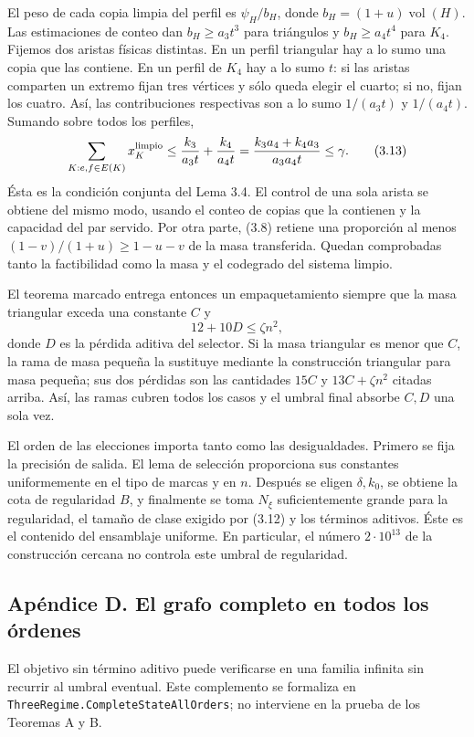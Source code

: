 \documentclass[spanish,11pt,a4paper]{article}
\begin{document}
El peso de cada copia limpia del perfil es \(\psi_H/b_H\), donde \(b_H=(1+u)\operatorname{vol}(H)\). Las estimaciones de conteo dan \(b_H\ge a_3t^3\) para triángulos y \(b_H\ge a_4t^4\) para \(K_4\). Fijemos dos aristas físicas distintas. En un perfil triangular hay a lo sumo una copia que las contiene. En un perfil de \(K_4\) hay a lo sumo \(t\): si las aristas comparten un extremo fijan tres vértices y sólo queda elegir el cuarto; si no, fijan los cuatro. Así, las contribuciones respectivas son a lo sumo \(1/(a_3t)\) y \(1/(a_4t)\). Sumando sobre todos los perfiles, \[
\sum_{K:e,f\in E(K)}x_K^{\rm limpio}
\le\frac{k_3}{a_3t}+\frac{k_4}{a_4t}
=\frac{k_3a_4+k_4a_3}{a_3a_4t}\le\gamma.
\tag{3.13}
\] Ésta es la condición conjunta del Lema 3.4. El control de una sola arista se obtiene del mismo modo, usando el conteo de copias que la contienen y la capacidad del par servido. Por otra parte, (3.8) retiene una proporción al menos \((1-v)/(1+u)\ge1-u-v\) de la masa transferida. Quedan comprobadas tanto la factibilidad como la masa y el codegrado del sistema limpio.

El teorema marcado entrega entonces un empaquetamiento siempre que la masa triangular exceda una constante \(C\) y \[
12+10D\le\zeta n^2,
\tag{3.14}
\] donde \(D\) es la pérdida aditiva del selector. Si la masa triangular es menor que \(C\), la rama de masa pequeña la sustituye mediante la construcción triangular para masa pequeña; sus dos pérdidas son las cantidades \(15C\) y \(13C+\zeta n^2\) citadas arriba. Así, las ramas cubren todos los casos y el umbral final absorbe \(C,D\) una sola vez.

El orden de las elecciones importa tanto como las desigualdades. Primero se fija la precisión de salida. El lema de selección proporciona sus constantes uniformemente en el tipo de marcas y en \(n\). Después se eligen \(\delta,k_0\), se obtiene la cota de regularidad \(B\), y finalmente se toma \(N_\xi\) suficientemente grande para la regularidad, el tamaño de clase exigido por (3.12) y los términos aditivos. Éste es el contenido del ensamblaje uniforme. En particular, el número \(2\cdot10^{13}\) de la construcción cercana no controla este umbral de regularidad.

\subsection{Apéndice D. El grafo completo en todos los órdenes}\label{apuxe9ndice-d.-el-grafo-completo-en-todos-los-uxf3rdenes}

El objetivo sin término aditivo puede verificarse en una familia infinita sin recurrir al umbral eventual. Este complemento se formaliza en \nolinkurl{ThreeRegime.CompleteStateAllOrders}; no interviene en la prueba de los Teoremas A y B.
\end{document}
